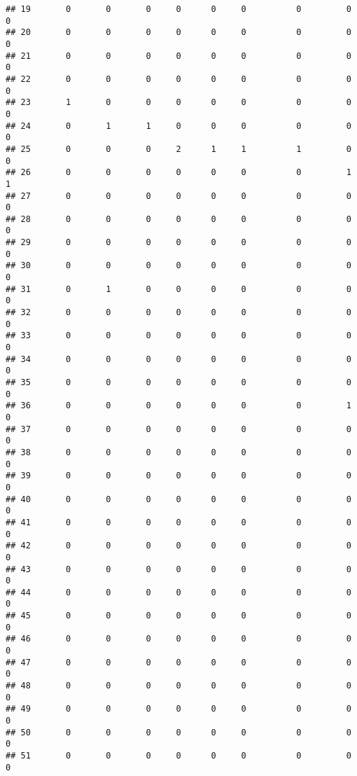 \documentclass[
]{article}
\begin{document}
\begin{verbatim}
## 19       0       0       0     0      0     0          0         0        0
## 20       0       0       0     0      0     0          0         0        0
## 21       0       0       0     0      0     0          0         0        0
## 22       0       0       0     0      0     0          0         0        0
## 23       1       0       0     0      0     0          0         0        0
## 24       0       1       1     0      0     0          0         0        0
## 25       0       0       0     2      1     1          1         0        0
## 26       0       0       0     0      0     0          0         1        1
## 27       0       0       0     0      0     0          0         0        0
## 28       0       0       0     0      0     0          0         0        0
## 29       0       0       0     0      0     0          0         0        0
## 30       0       0       0     0      0     0          0         0        0
## 31       0       1       0     0      0     0          0         0        0
## 32       0       0       0     0      0     0          0         0        0
## 33       0       0       0     0      0     0          0         0        0
## 34       0       0       0     0      0     0          0         0        0
## 35       0       0       0     0      0     0          0         0        0
## 36       0       0       0     0      0     0          0         1        0
## 37       0       0       0     0      0     0          0         0        0
## 38       0       0       0     0      0     0          0         0        0
## 39       0       0       0     0      0     0          0         0        0
## 40       0       0       0     0      0     0          0         0        0
## 41       0       0       0     0      0     0          0         0        0
## 42       0       0       0     0      0     0          0         0        0
## 43       0       0       0     0      0     0          0         0        0
## 44       0       0       0     0      0     0          0         0        0
## 45       0       0       0     0      0     0          0         0        0
## 46       0       0       0     0      0     0          0         0        0
## 47       0       0       0     0      0     0          0         0        0
## 48       0       0       0     0      0     0          0         0        0
## 49       0       0       0     0      0     0          0         0        0
## 50       0       0       0     0      0     0          0         0        0
## 51       0       0       0     0      0     0          0         0        0

\end{verbatim}
\end{document}

